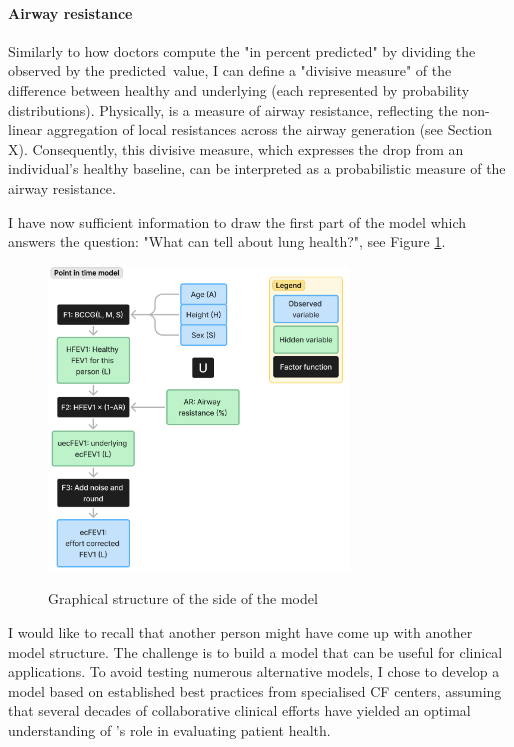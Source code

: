 \paragraph{Airway resistance}
Similarly to how doctors compute the "\F in percent predicted" by dividing the observed \F by the predicted\ value, I can define a "divisive measure" of the difference between healthy and underlying \F (each represented by probability distributions). Physically, \F is a measure of airway resistance, reflecting the non-linear aggregation of local resistances across the airway generation (see Section X). Consequently, this divisive measure, which expresses the drop from an individual's healthy \F baseline, can be interpreted as a probabilistic measure of the airway resistance.

I have now sufficient information to draw the first part of the model which answers the question: "What can \F tell about lung health?", see Figure \ref{graph:fev1_side}.

\begin{figure}[!h]
    \caption{Graphical structure of the \F side of the model}
    \centering
    \includegraphics[width=80mm]{Chapter1/Figs/fev1_side_model_structure.png}
    \label{graph:fev1_side}
\end{figure}

I would like to recall that another person might have come up with another model structure. The challenge is to build a model that can be useful for clinical applications. To avoid testing numerous alternative models, I chose to develop a model based on established best practices from specialised CF centers, assuming that several decades of collaborative clinical efforts have yielded an optimal understanding of \F's role in evaluating patient health.

